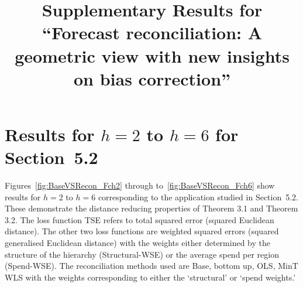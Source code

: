 \documentclass[12pt]{article}
\title{\bf Supplementary Results for ``Forecast reconciliation: A geometric view with new insights on bias correction''}
\begin{document}
  \maketitle
  \section{Results for $h=2$ to $h=6$ for Section~5.2}
  	
  	
  	Figures~\ref{fig:BaseVSRecon_Fch2} through to~\ref{fig:BaseVSRecon_Fch6} show results for $h=2$ to $h=6$ corresponding to the application studied in Section~5.2.  These demonstrate the distance reducing properties of Theorem 3.1 and Theorem 3.2. The loss function TSE refers to total squared error (squared Euclidean distance).  The other two loss functions are weighted squared errors (squared generalised Euclidean distance) with the weights either determined by the structure of the hierarchy (Structural-WSE) or the average spend per region (Spend-WSE).  The reconciliation methods used are Base, bottom up, OLS, MinT WLS with the weights corresponding to either the `structural' or `spend weights.' 
  	
\end{document}

